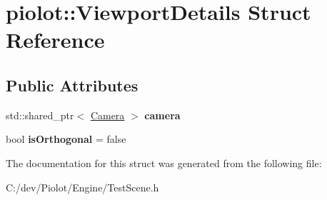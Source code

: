 \hypertarget{structpiolot_1_1_viewport_details}{}\section{piolot\+:\+:Viewport\+Details Struct Reference}
\label{structpiolot_1_1_viewport_details}
\subsection*{Public Attributes}
\begin{DoxyCompactItemize}
\item 
\mbox{\label{structpiolot_1_1_viewport_details_ae1d4ed0dd422ab73a97df92029403adc}} 
std\+::shared\+\_\+ptr$<$ \mbox{\hyperlink{classpiolot_1_1_camera}{Camera}} $>$ {\bfseries camera}
\item 
\mbox{\label{structpiolot_1_1_viewport_details_aabc49675aefc2a8adfb75939a6cfcb81}} 
bool {\bfseries is\+Orthogonal} = false
\end{DoxyCompactItemize}


The documentation for this struct was generated from the following file\+:\begin{DoxyCompactItemize}
\item 
C\+:/dev/\+Piolot/\+Engine/Test\+Scene.\+h\end{DoxyCompactItemize}
